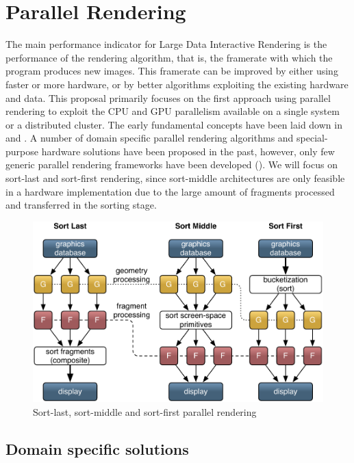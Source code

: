 \section{Parallel Rendering}

The main performance indicator for Large Data Interactive Rendering is the
performance of the rendering algorithm, that is, the framerate with which the
program produces new images. This framerate can be improved by either using
faster or more hardware, or by better algorithms exploiting the existing
hardware and data. This proposal primarily focuses on the first approach using
parallel rendering to exploit the CPU and GPU parallelism available on a single
system or a distributed cluster.  The early fundamental concepts have been laid
down in \cite{MCEF:94} and \cite{Crockett:97}. A number of domain specific
parallel rendering algorithms and special-purpose hardware solutions have been
proposed in the past, however, only few generic parallel rendering frameworks
have been developed (). We will focus on sort-last and sort-first
rendering, since sort-middle architectures are only feasible in a hardware
implementation due to the large amount of fragments processed and transferred in
the sorting stage.

\begin{figure}[ht]\center
 \includegraphics[width=\textwidth]{images/all_sorts}%
 \caption{Sort-last, sort-middle and sort-first parallel rendering\label{fSorts}}
\end{figure}


\subsection{Domain specific solutions}


